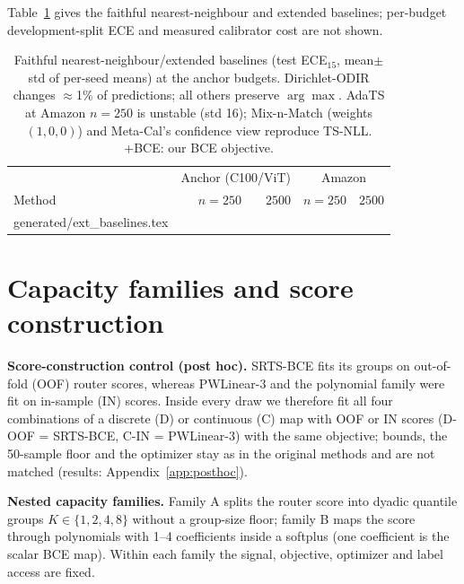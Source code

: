 \documentclass[sigconf,anonymous,review]{acmart}
\makeatletter
\newcommand{\tablerows}[1]{\@@input #1.tex }
\makeatother
\begin{document}
Table~\ref{tab:ext} gives the faithful nearest-neighbour and extended
baselines; per-budget development-split ECE and measured calibrator cost are not
shown.
\begin{table}[t]
\centering\small
\setlength{\tabcolsep}{3pt}
\caption{Faithful nearest-neighbour/extended baselines (test
ECE$_{15}$, mean$\pm$std of per-seed means) at the anchor budgets.
Dirichlet-ODIR changes $\approx$1\% of predictions; all others preserve
$\arg\max$. AdaTS at Amazon $n{=}250$ is unstable (std 16); Mix-n-Match
(weights $(1,0,0)$) and Meta-Cal's confidence view reproduce TS-NLL. +BCE: our BCE objective.}
\label{tab:ext}
\begin{tabular}{lrrrr}
\toprule
& \multicolumn{2}{c}{Anchor (C100/ViT)} & \multicolumn{2}{c}{Amazon}\\
Method & $n{=}250$ & $2500$ & $n{=}250$ & $2500$\\
\midrule
\tablerows{generated/ext_baselines}
\bottomrule
\end{tabular}
\end{table}

\section{Capacity families and score construction}
\label{app:capacity}
\textbf{Score-construction control (post hoc).} SRTS-BCE fits its groups
on out-of-fold (OOF) router scores, whereas PWLinear-3 and the polynomial
family were fit on in-sample (IN) scores. Inside every draw we therefore
fit all four combinations of a discrete (D) or continuous (C) map with OOF
or IN scores (D-OOF = SRTS-BCE, C-IN = PWLinear-3) with the same
objective; bounds, the 50-sample floor and the optimizer stay as in the
original methods and are not matched (results: Appendix~\ref{app:posthoc}).

\textbf{Nested capacity families.} Family A splits the router score into
dyadic quantile groups $K\in\{1,2,4,8\}$ without a group-size floor;
family B maps the score through polynomials with 1--4 coefficients inside
a softplus (one coefficient is the scalar BCE map). Within each family the
signal, objective, optimizer and label access are fixed.
\end{document}
